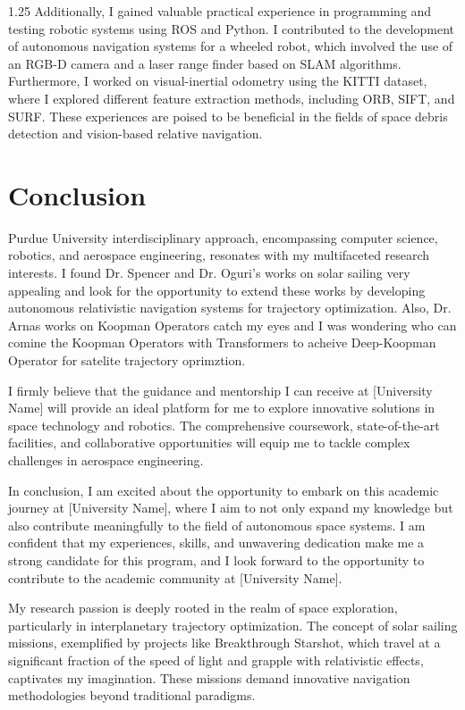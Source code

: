 \documentclass[a4paper,12pt]{article}
\begin{document}
\begin{spacing}{1.25}
Additionally, I gained valuable practical experience in programming and testing robotic systems using ROS and Python. I contributed to the development of autonomous navigation systems for a wheeled robot, which involved the use of an RGB-D camera and a laser range finder based on SLAM algorithms. Furthermore, I worked on visual-inertial odometry using the KITTI dataset, where I explored different feature extraction methods, including ORB, SIFT, and SURF. These experiences are poised to be beneficial in the fields of space debris detection and vision-based relative navigation.


\section{Conclusion}

Purdue University interdisciplinary approach, encompassing computer science, robotics, and aerospace engineering, resonates with my multifaceted research interests. I found Dr. Spencer and Dr. Oguri's works on solar sailing very appealing and look for the opportunity to extend these works by developing autonomous relativistic navigation systems for trajectory optimization. Also, Dr. Arnas works on Koopman Operators catch my eyes and I was wondering who can comine the Koopman Operators with Transformers to acheive Deep-Koopman Operator for satelite trajectory oprimztion.

I firmly believe that the guidance and mentorship I can receive at [University Name] will provide an ideal platform for me to explore innovative solutions in space technology and robotics. The comprehensive coursework, state-of-the-art facilities, and collaborative opportunities will equip me to tackle complex challenges in aerospace engineering.

In conclusion, I am excited about the opportunity to embark on this academic journey at [University Name], where I aim to not only expand my knowledge but also contribute meaningfully to the field of autonomous space systems. I am confident that my experiences, skills, and unwavering dedication make me a strong candidate for this program, and I look forward to the opportunity to contribute to the academic community at [University Name].




My research passion is deeply rooted in the realm of space exploration, particularly in interplanetary trajectory optimization. The concept of solar sailing missions, exemplified by projects like Breakthrough Starshot, which travel at a significant fraction of the speed of light and grapple with relativistic effects, captivates my imagination. These missions demand innovative navigation methodologies beyond traditional paradigms.


\end{spacing}
\end{document}

